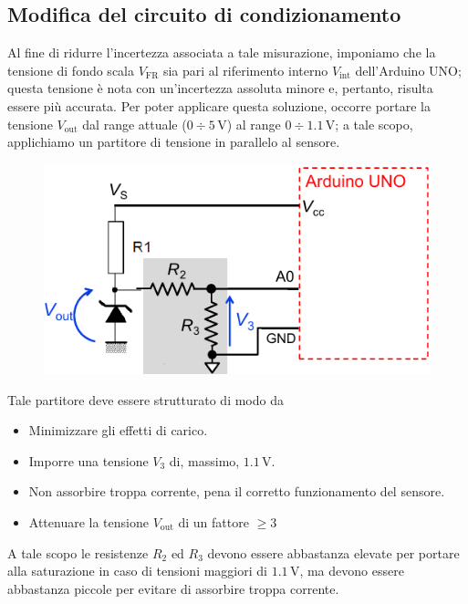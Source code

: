 \documentclass[a4paper]{article}
\begin{document}
		\subsection{Modifica del circuito di condizionamento}
			Al fine di ridurre l'incertezza associata a tale misurazione, imponiamo che la tensione di fondo scala $ V_{\mathrm{FR}} $ sia pari al riferimento interno $ V_{\mathrm{int}} $ dell'Arduino UNO; questa tensione è nota con un'incertezza assoluta minore e, pertanto, risulta essere più accurata.
			\newline
			Per poter applicare questa soluzione, occorre portare la tensione $ V_{\mathrm{out}} $ dal range attuale ($ 0 \div 5 \, \mathrm{V} $) al range $ 0 \div 1.1 \, \mathrm{V} $; a tale scopo, applichiamo un partitore di tensione in parallelo al sensore.
			\begin{figure}[h!]
				\centering
				\includegraphics[scale=0.5]{collegamentoCircuitoArduinoPartitore}
				\label{fig:collegamentoCircuitoArduinoPartitore}
			\end{figure}
			\newpage
			Tale partitore deve essere strutturato di modo da
			\begin{itemize}
				\item Minimizzare gli effetti di carico.
				\item Imporre una tensione $ V_{3} $ di, massimo, $ 1.1 \, \mathrm{V} $.
				\item Non assorbire troppa corrente, pena il corretto funzionamento del sensore.
				\item Attenuare la tensione $ V_{\mathrm{out}} $ di un fattore $ \ge 3 $
			\end{itemize}
			A tale scopo le resistenze $ R_{2} $ ed $ R_{3} $ devono essere abbastanza elevate per portare alla saturazione in caso di tensioni maggiori di $ 1.1 \, \mathrm{V} $, ma devono essere abbastanza piccole per evitare di assorbire troppa corrente.
\end{document}
